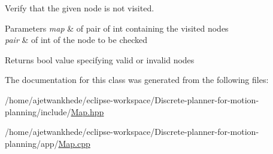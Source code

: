 Verify that the given node is not visited. 


\begin{DoxyParams}{Parameters}
{\em map} & of pair of int containing the visited nodes \\
\hline
{\em pair} & of int of the node to be checked \\
\hline
\end{DoxyParams}
\begin{DoxyReturn}{Returns}
bool value specifying valid or invalid nodes 
\end{DoxyReturn}


The documentation for this class was generated from the following files\+:\begin{DoxyCompactItemize}
\item 
/home/ajetwankhede/eclipse-\/workspace/\+Discrete-\/planner-\/for-\/motion-\/planning/include/\mbox{\hyperlink{Map_8hpp}{Map.\+hpp}}\item 
/home/ajetwankhede/eclipse-\/workspace/\+Discrete-\/planner-\/for-\/motion-\/planning/app/\mbox{\hyperlink{Map_8cpp}{Map.\+cpp}}\end{DoxyCompactItemize}
